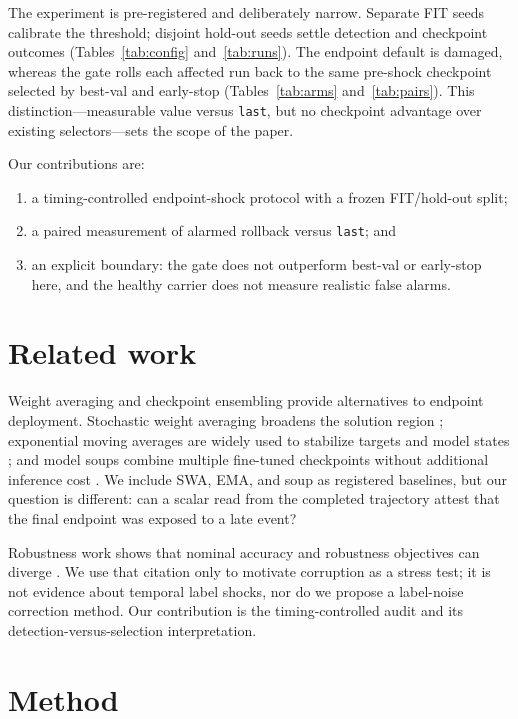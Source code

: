 \documentclass{article} %
\theoremstyle{remark}
\begin{document}
The experiment is pre-registered and deliberately narrow. Separate FIT seeds calibrate the
threshold; disjoint hold-out seeds settle detection and checkpoint outcomes
(Tables~\ref{tab:config} and~\ref{tab:runs}). The endpoint default is damaged, whereas the gate rolls
each affected run back to the same pre-shock checkpoint selected by best-val and early-stop
(Tables~\ref{tab:arms} and~\ref{tab:pairs}). This distinction---measurable value versus
\texttt{last}, but no checkpoint advantage over existing selectors---sets the scope of the paper.

Our contributions are:
\begin{enumerate}
\item a timing-controlled endpoint-shock protocol with a frozen FIT/hold-out split;
\item a paired measurement of alarmed rollback versus \texttt{last}; and
\item an explicit boundary: the gate does not outperform best-val or early-stop here, and the
healthy carrier does not measure realistic false alarms.
\end{enumerate}

\section{Related work}
\label{sec:related}

Weight averaging and checkpoint ensembling provide alternatives to endpoint deployment. Stochastic
weight averaging broadens the solution region \citep{swa}; exponential moving averages are widely
used to stabilize targets and model states \citep{ema}; and model soups combine multiple
fine-tuned checkpoints without additional inference cost \citep{wortsditcher2022}. We include
SWA, EMA, and soup as registered baselines, but our question is different: can a scalar read from
the completed trajectory attest that the final endpoint was exposed to a late event?

Robustness work shows that nominal accuracy and robustness objectives can diverge
\citep{labelnoise}. We use that citation only to motivate corruption as a stress test; it is not
evidence about temporal label shocks, nor do we propose a label-noise correction method. Our
contribution is the timing-controlled audit and its detection-versus-selection interpretation.

\section{Method}
\label{sec:method}
\end{document}
